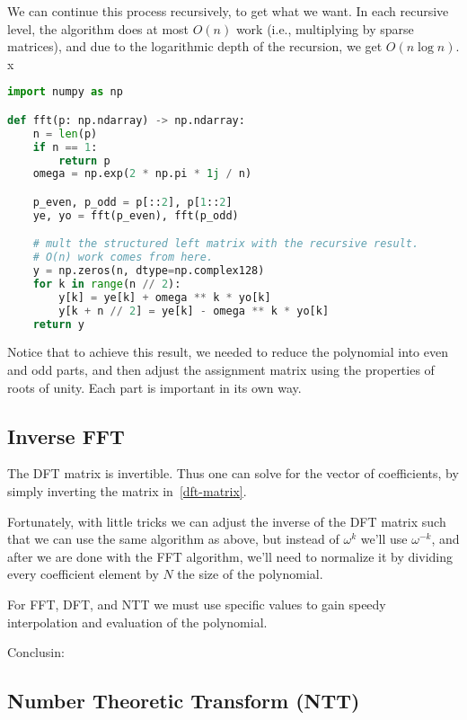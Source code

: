 We can continue this process recursively, to get what we want.
 In each recursive level, the algorithm does at most $O(n)$ work (i.e., multiplying by sparse matrices),
  and due to the logarithmic depth of the recursion, we get $O(n\log{n})$.
x
\label{algorithm:fft}
  \begin{lstlisting}[language=Python,
    caption={fft algorithm in python}
  ]
import numpy as np

def fft(p: np.ndarray) -> np.ndarray:
    n = len(p)
    if n == 1:
        return p
    omega = np.exp(2 * np.pi * 1j / n)

    p_even, p_odd = p[::2], p[1::2] 
    ye, yo = fft(p_even), fft(p_odd)

    # mult the structured left matrix with the recursive result.
    # O(n) work comes from here.
    y = np.zeros(n, dtype=np.complex128)
    for k in range(n // 2):
        y[k] = ye[k] + omega ** k * yo[k]
        y[k + n // 2] = ye[k] - omega ** k * yo[k]
    return y
    \end{lstlisting}
    
    \begin{remark}[Summary]
      Notice that to achieve this result, we needed to reduce the polynomial into
      even and odd parts, and then adjust the assignment matrix using
      the properties of roots of unity. Each part is important in its own way.
    \end{remark}
\subsection{Inverse FFT}\label{ifft}

The DFT matrix is invertible.
Thus one can solve for the vector of coefficients,
by simply inverting the matrix in~\ref{dft-matrix}.

Fortunately, with little tricks we can adjust the inverse of the DFT matrix such that
we can use the same algorithm as above, but instead of
$\omega^k$ we'll use $\omega^{-k}$, and after we are done with the FFT
algorithm, we'll need to normalize it by dividing every coefficient element
by $N$ the size of the polynomial.

 \begin{corollary}
  For FFT, DFT, and NTT we must use specific values to gain speedy interpolation and
  evaluation of the polynomial. 
 \end{corollary}{Conclusin:}
 
\subsection{Number Theoretic Transform (NTT)}\label{ntt}

